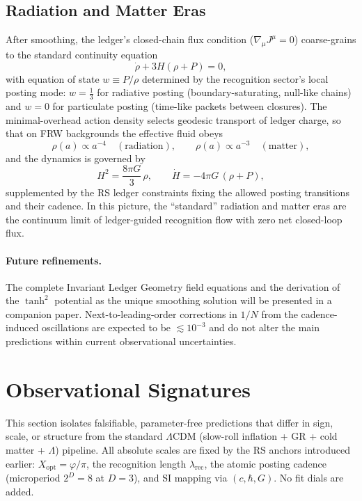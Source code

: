 \documentclass[11pt]{article}
\theoremstyle{definition}
\theoremstyle{remark}
\begin{document}
\subsection{Radiation and Matter Eras}
After smoothing, the ledger’s closed-chain flux condition (\(\nabla_\mu J^\mu=0\)) coarse-grains to the standard continuity equation \citep{Dodelson2020}
\begin{equation}
  \dot\rho + 3H(\rho+P)=0,
  \label{eq:continuity}
\end{equation}
with equation of state \(w\equiv P/\rho\) determined by the recognition sector’s local posting mode: \(w=\tfrac{1}{3}\) for radiative posting (boundary-saturating, null-like chains) and \(w=0\) for particulate posting (time-like packets between closures). The minimal-overhead action density selects geodesic transport of ledger charge, so that on FRW backgrounds the effective fluid obeys
\begin{equation}
  \rho(a)\propto a^{-4} \quad (\text{radiation}), 
  \qquad
  \rho(a)\propto a^{-3} \quad (\text{matter}),
  \label{eq:eras}
\end{equation}
and the dynamics is governed by
\begin{equation}
  H^2=\frac{8\pi G}{3}\,\rho, 
  \qquad 
  \dot H = -4\pi G\,(\rho+P),
  \label{eq:friedmann}
\end{equation}
supplemented by the RS ledger constraints fixing the allowed posting transitions and their cadence. In this picture, the “standard” radiation and matter eras are the continuum limit of ledger-guided recognition flow with zero net closed-loop flux.

\paragraph{Future refinements.}
The complete Invariant Ledger Geometry field equations and the derivation of the \(\tanh^2\) potential as the unique smoothing solution will be presented in a companion paper. Next-to-leading-order corrections in \(1/N\) from the cadence-induced oscillations are expected to be \(\lesssim 10^{-3}\) and do not alter the main predictions within current observational uncertainties.

\section{Observational Signatures}

This section isolates falsifiable, parameter-free predictions that differ in sign, scale, or structure from the standard \(\Lambda\)CDM (slow-roll inflation + GR + cold matter + \(\Lambda\)) pipeline. All absolute scales are fixed by the RS anchors introduced earlier: \(X_{\mathrm{opt}}=\varphi/\pi\), the recognition length \(\lambda_{\mathrm{rec}}\), the atomic posting cadence (microperiod \(2^D=8\) at \(D=3\)), and SI mapping via \((c,\hbar,G)\). No fit dials are added.
\end{document}
